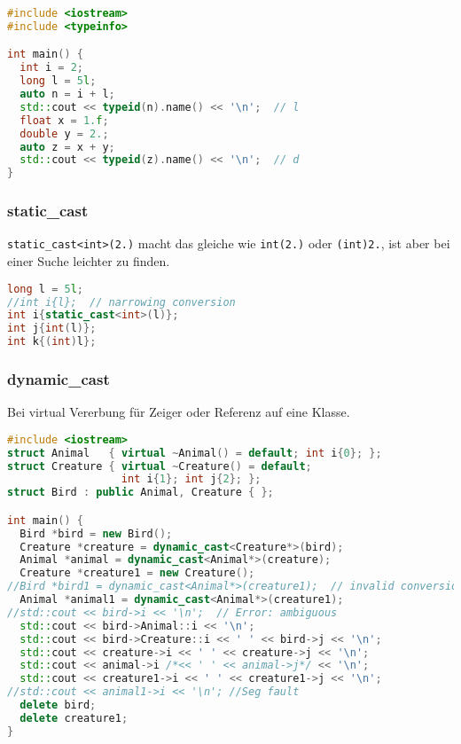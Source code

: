 \documentclass[10pt,twocolumn]{scrartcl}
\begin{document}
\begin{lstlisting}[language=C++]
#include <iostream>
#include <typeinfo>

int main() {
  int i = 2;
  long l = 5l;
  auto n = i + l;
  std::cout << typeid(n).name() << '\n';  // l
  float x = 1.f;
  double y = 2.;
  auto z = x + y;
  std::cout << typeid(z).name() << '\n';  // d
}
\end{lstlisting}

\subsubsection{static\_cast}

\lstinline|static_cast<int>(2.)| macht das gleiche wie \lstinline|int(2.)| oder
\lstinline|(int)2.|, ist aber bei einer Suche leichter zu finden.

\begin{lstlisting}[language=C++]
long l = 5l;
//int i{l};  // narrowing conversion
int i{static_cast<int>(l)};
int j{int(l)};
int k{(int)l};
\end{lstlisting}

\subsubsection{dynamic\_cast}

Bei virtual Vererbung für Zeiger oder Referenz auf eine Klasse.

\begin{lstlisting}[language=C++]
#include <iostream>
struct Animal   { virtual ~Animal() = default; int i{0}; };
struct Creature { virtual ~Creature() = default;
                  int i{1}; int j{2}; };
struct Bird : public Animal, Creature { };

int main() {
  Bird *bird = new Bird();
  Creature *creature = dynamic_cast<Creature*>(bird);
  Animal *animal = dynamic_cast<Animal*>(creature);
  Creature *creature1 = new Creature();
//Bird *bird1 = dynamic_cast<Animal*>(creature1);  // invalid conversion
  Animal *animal1 = dynamic_cast<Animal*>(creature1);
//std::cout << bird->i << '\n';  // Error: ambiguous
  std::cout << bird->Animal::i << '\n';
  std::cout << bird->Creature::i << ' ' << bird->j << '\n';
  std::cout << creature->i << ' ' << creature->j << '\n';
  std::cout << animal->i /*<< ' ' << animal->j*/ << '\n';
  std::cout << creature1->i << ' ' << creature1->j << '\n';
//std::cout << animal1->i << '\n'; //Seg fault
  delete bird;
  delete creature1;
}
\end{lstlisting}
\end{document}
